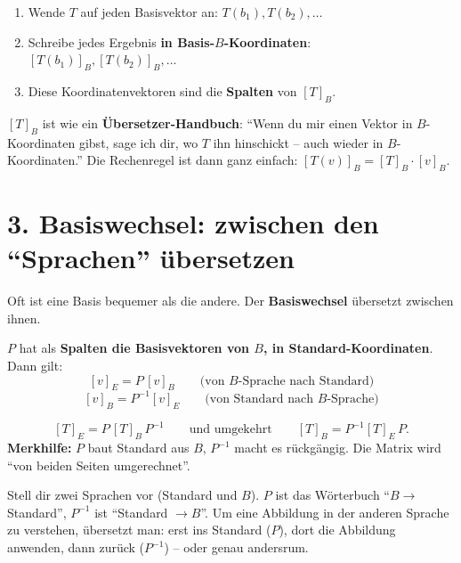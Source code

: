 \documentclass[a4paper,12pt]{article}
\begin{document}
\begin{merkbox}[title={Bauanleitung f\"ur $[T]_B$}]
\begin{enumerate}[nosep]
    \item Wende $T$ auf jeden Basisvektor an: $T(b_1), T(b_2), \dots$
    \item Schreibe jedes Ergebnis \textbf{in Basis-$B$-Koordinaten}: $[T(b_1)]_B, [T(b_2)]_B, \dots$
    \item Diese Koordinatenvektoren sind die \textbf{Spalten} von $[T]_B$.
\end{enumerate}
\end{merkbox}

\begin{analogie}
$[T]_B$ ist wie ein \textbf{\"Ubersetzer-Handbuch}: ``Wenn du mir einen Vektor in $B$-Koordinaten gibst, sage ich dir, wo $T$ ihn hinschickt -- auch wieder in $B$-Koordinaten.'' Die Rechenregel ist dann ganz einfach: $[T(v)]_B = [T]_B \cdot [v]_B$.
\end{analogie}

\section*{3. Basiswechsel: zwischen den ``Sprachen'' \"ubersetzen}

Oft ist eine Basis bequemer als die andere. Der \textbf{Basiswechsel} \"ubersetzt zwischen ihnen.

\begin{merkbox}[title={Die Basiswechselmatrix $P$}]
$P$ hat als \textbf{Spalten die Basisvektoren von $B$, in Standard-Koordinaten}. Dann gilt:
\[
[v]_E = P \, [v]_B \qquad\text{(von $B$-Sprache nach Standard)}
\]
\[
[v]_B = P^{-1} [v]_E \qquad\text{(von Standard nach $B$-Sprache)}
\]
\end{merkbox}

\begin{merkbox}[title={Basiswechsel f\"ur Abbildungen}]
\[
[T]_E = P\,[T]_B\,P^{-1} \qquad\text{und umgekehrt}\qquad [T]_B = P^{-1} [T]_E\, P.
\]
\textbf{Merkhilfe:} $P$ baut Standard aus $B$, $P^{-1}$ macht es r\"uckg\"angig. Die Matrix wird ``von beiden Seiten umgerechnet''.
\end{merkbox}

\begin{analogie}
Stell dir zwei Sprachen vor (Standard und $B$). $P$ ist das W\"orterbuch ``$B \to$ Standard'', $P^{-1}$ ist ``Standard $\to B$''. Um eine Abbildung in der anderen Sprache zu verstehen, \"ubersetzt man: erst ins Standard ($P$), dort die Abbildung anwenden, dann zur\"uck ($P^{-1}$) -- oder genau andersrum.
\end{analogie}
\end{document}
